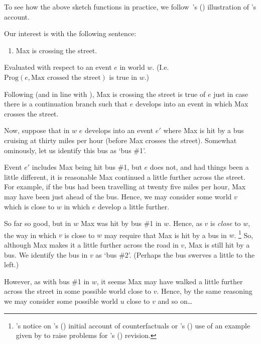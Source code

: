\begin{note}
  To see how the above sketch functions in practice, we follow~\citeauthor{Portner:1998um}'s (\citeyear[764--766]{Portner:1998um}) illustration of \citeauthor{Landman:1992wh}'s account.
\end{note}

\begin{note}
  Our interest is with the following sentence:
  \begin{enumerate}
  \item
    \label{prog:max:bad}
    Max is crossing the street.
  \end{enumerate}
  Evaluated with respect to an event \(e\) in world \(w\).
  (I.e. \(\text{Prog}(e,\text{Max crossed the street})\) is true in \(w\).)

  Following \citeauthor{Landman:1992wh} (and in line with \assuPP{}), Max is crossing the street is true of \(e\) just in case there is a continuation branch such that \(e\) develops into an event in which Max crosses the street.

  Now, suppose that in \(w\) \(e\) develops into an event \(e'\) where Max is hit by a bus cruising at thirty miles per hour (before Max crosses the street).
  Somewhat ominously, let us identify this bus as `bus \#1'.

  Event \(e'\) includes Max being hit bus \#1, but \(e\) does not, and had things been a little different, it is reasonable Max continued a little further across the street.
  For example, if the bus had been travelling at twenty five miles per hour, Max may have been just ahead of the bus.
  Hence, we may consider some world \(v\) which is close to \(w\) in which \(e\) develop a little further.

  So far so good, but in \(w\) Max was hit by bus \#1 in \(w\).
  Hence, as \(v\) is \emph{close} to \(w\), the way in which \(v\) is close to \(w\) may require that Max is hit by a bus in \(w\).%
  \footnote{
    \citeauthor{Fine:1975tj}'s notice on \citeauthor{Lewis:1973th}'s (\citeyear{Lewis:1973th}) initial account of counterfactuals or \citeauthor{Veltman:2005tj}'s (\citeyear{Veltman:2005tj}) use of an example given by \textcite{Tichy:1976tp} to raise problems for \citeauthor{Lewis:1979vm}'s (\citeyear{Lewis:1979vm}) revision.
  }
  So, although Max makes it a little further across the road in \(v\), Max is still hit by a bus.
  We identify the bus in \(v\) as `bus \#2'.
  (Perhaps the bus swerves a little to the left.)

  However, as with bus \#1 in \(w\), it seems Max may have walked a little further across the street in some possible world close to \(v\).
  Hence, by the same reasoning we may consider some possible world \(u\) close to \(v\) and so on\dots


\end{note}
